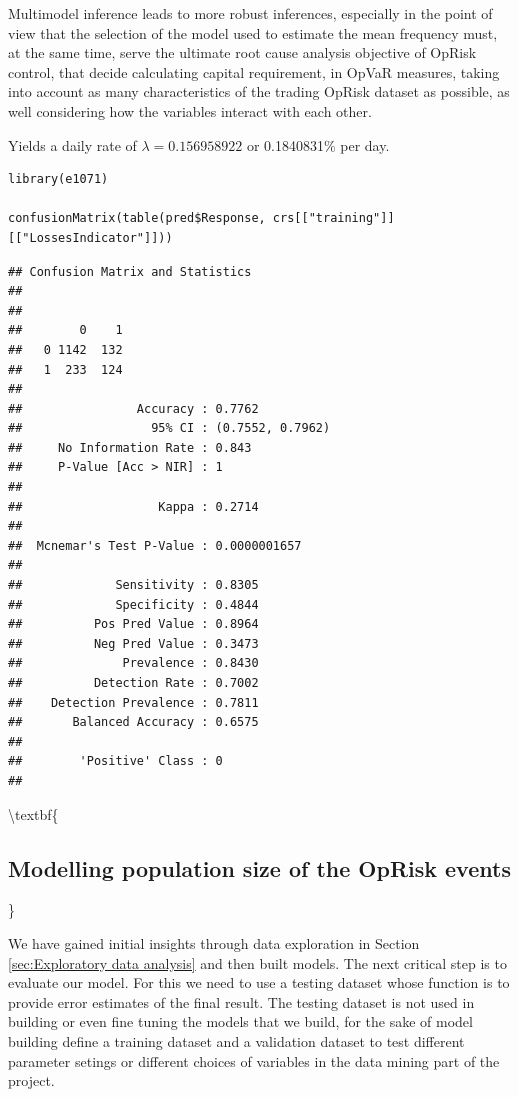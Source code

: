 \documentclass{DissertateUSU}
\begin{document}
Multimodel inference leads to more robust inferences, especially in the
point of view that the selection of the model used to estimate the mean
frequency must, at the same time, serve the ultimate root cause analysis
objective of OpRisk control, that decide calculating capital
requirement, in OpVaR measures, taking into account as many
characteristics of the trading OpRisk dataset as possible, as well
considering how the variables interact with each other.

Yields a daily rate of \(\lambda = 0.156958922\) or 0.1840831\% per
day.\medskip

\begin{verbatim}
library(e1071)

confusionMatrix(table(pred$Response, crs[["training"]][["LossesIndicator"]]))
\end{verbatim}

\begin{verbatim}
## Confusion Matrix and Statistics
## 
##    
##        0    1
##   0 1142  132
##   1  233  124
##                                           
##                Accuracy : 0.7762          
##                  95% CI : (0.7552, 0.7962)
##     No Information Rate : 0.843           
##     P-Value [Acc > NIR] : 1               
##                                           
##                   Kappa : 0.2714          
##                                           
##  Mcnemar's Test P-Value : 0.0000001657    
##                                           
##             Sensitivity : 0.8305          
##             Specificity : 0.4844          
##          Pos Pred Value : 0.8964          
##          Neg Pred Value : 0.3473          
##              Prevalence : 0.8430          
##          Detection Rate : 0.7002          
##    Detection Prevalence : 0.7811          
##       Balanced Accuracy : 0.6575          
##                                           
##        'Positive' Class : 0               
## 
\end{verbatim}

\textbackslash{}textbf\{

\subsection{Modelling population size of the OpRisk events}

\}

We have gained initial insights through data exploration in Section
\ref{sec:Exploratory data analysis} and then built models. The next
critical step is to evaluate our model. For this we need to use a
testing dataset whose function is to provide error estimates of the
final result. The testing dataset is not used in building or even fine
tuning the models that we build, for the sake of model building define a
training dataset and a validation dataset to test different parameter
setings or different choices of variables in the data mining part of the
project.\medskip
\end{document}
